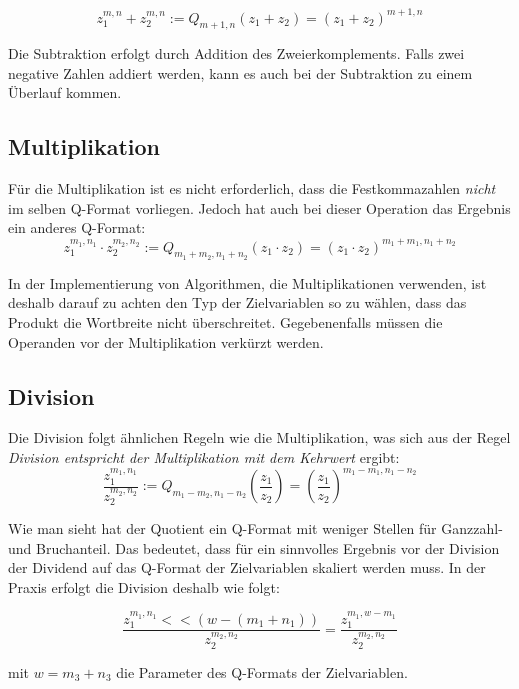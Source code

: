 \[z_1^{m,n}+z_2^{m,n} := Q_{m+1,n}(z_1+z_2) = (z_1+z_2)^{m+1,n}\]

Die Subtraktion erfolgt durch Addition des Zweierkomplements. Falls zwei negative Zahlen addiert werden, kann es auch bei der Subtraktion zu einem Überlauf kommen.

\subsection{Multiplikation}
Für die Multiplikation ist es nicht erforderlich, dass die Festkommazahlen \emph{nicht} im selben Q-Format vorliegen. Jedoch hat auch bei dieser Operation das Ergebnis ein anderes Q-Format:
\[z_1^{m_1,n_1}\cdot z_2^{m_2,n_2} := Q_{m_1+m_2,n_1+n_2}(z_1\cdot z_2) = (z_1\cdot z_2)^{m_1+m_1,n_1+n_2}\]

In der Implementierung von Algorithmen, die Multiplikationen verwenden, ist deshalb darauf zu achten den Typ der Zielvariablen so zu wählen, dass das Produkt die Wortbreite nicht überschreitet. Gegebenenfalls müssen die Operanden vor der Multiplikation verkürzt werden.

\subsection{Division}
Die Division folgt ähnlichen Regeln wie die Multiplikation, was sich aus der Regel \emph{Division entspricht der Multiplikation mit dem Kehrwert} ergibt:
\[\frac{z_1^{m_1,n_1}}{z_2^{m_2,n_2}} := Q_{m_1-m_2,n_1-n_2}\left(\frac{z_1}{z_2}\right) = \left(\frac{z_1}{z_2}\right)^{m_1-m_1,n_1-n_2}\]

Wie man sieht hat der Quotient ein Q-Format mit weniger Stellen für Ganzzahl- und Bruchanteil. Das bedeutet, dass für ein sinnvolles Ergebnis vor der Division der Dividend auf das Q-Format der Zielvariablen skaliert werden muss. In der Praxis erfolgt die Division deshalb wie folgt:

\[\frac{z_1^{m_1,n_1}<<(w-(m_1+n_1))}{z_2^{m_2,n_2}} = \frac{z_1^{m_1,w-m_1}}{z_2^{m_2,n_2}} \]

mit $w=m_3+n_3$ die Parameter des Q-Formats der Zielvariablen.
